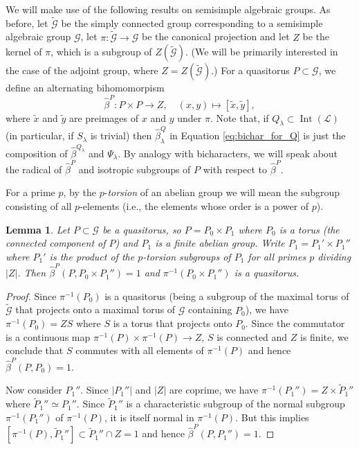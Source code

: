 \documentclass[a4paper,reqno]{amsart}
\newtheorem{lemma}[theorem]{Lemma}
\theoremstyle{definition}
\numberwithin{theorem}{section}
\numberwithin{equation}{section}
\begin{document}
We will make use of the following results on semisimple algebraic groups. As before, let $\tilde{\mathcal{G}}$ be the simply connected group corresponding to a semisimple algebraic group ${\mathcal{G}}$, let $\pi\colon\tilde{\mathcal{G}}\to{\mathcal{G}}$ be the canonical projection and let $Z$ be the kernel of $\pi$, which is a subgroup of $Z(\tilde{\mathcal{G}})$. (We will be primarily interested in the case of the adjoint group, where $Z=Z(\tilde{\mathcal{G}})$.) For a quasitorus $P\subset{\mathcal{G}}$, we define an alternating bihomomorpism
\begin{equation}\label{eq:def_beta_quasitorus}
\hat{\beta}^P\colon P\times P\to Z,\quad (x,y)\mapsto [\tilde{x},\tilde{y}],
\end{equation}
where $\tilde{x}$ and $\tilde{y}$ are preimages of $x$ and $y$ under $\pi$. Note that, if $Q_\lambda\subset\operatorname{\mathrm{Int}}({\mathcal{L}})$  (in particular, if $S_\lambda$ is trivial) then $\hat{\beta}_\lambda^Q$ in Equation \eqref{eq:bichar_for_Q} is just the composition of $\hat{\beta}^{Q_\lambda}$ and $\Psi_\lambda$. By analogy with bicharacters, we will speak about the radical of $\hat{\beta}^P$ and isotropic subgroups of $P$ with respect to $\hat{\beta}^P$.

For a prime $p$, by the $p$-{\em torsion} of an abelian group we will mean the subgroup consisting of all $p$-elements (i.e., the elements whose order is a power of $p$).

\begin{lemma}\label{lm:1}
Let $P\subset{\mathcal{G}}$ be a quasitorus, so $P=P_0\times P_1$ where $P_0$ is a torus (the connected component of $P$) and $P_1$ is a finite abelian group. Write $P_1=P_1'\times P_1''$ where $P_1'$ is the product of the $p$-torsion subgroups of $P_1$ for all primes $p$ dividing $|Z|$. Then $\hat{\beta}^P(P,P_0\times P_1'')=1$ and $\pi^{-1}(P_0\times P_1'')$ is a quasitorus.
\end{lemma}

\begin{proof}
Since $\pi^{-1}(P_0)$ is a quasitorus (being a subgroup of the maximal torus of $\tilde{\mathcal{G}}$ that projects onto a maximal torus of ${\mathcal{G}}$ containing $P_0$), we have $\pi^{-1}(P_0)=ZS$ where $S$ is a torus that projects onto $P_0$. Since the commutator is a continuous map $\pi^{-1}(P)\times\pi^{-1}(P)\to Z$, $S$ is connected and $Z$ is finite, we conclude that $S$ commutes with all elements of $\pi^{-1}(P)$ and hence $\hat{\beta}^P(P,P_0)=1$. 

Now consider $P_1''$. Since $|P_1''|$ and $|Z|$ are coprime, we have $\pi^{-1}(P_1'')=Z\times\tilde{P}_1''$ where $\tilde{P}_1''\simeq P_1''$. Since $\tilde{P}_1''$ is a characteristic subgroup of the normal subgroup $\pi^{-1}(P_1'')$ of $\pi^{-1}(P)$, it is itself normal in $\pi^{-1}(P)$. But this implies $[\pi^{-1}(P),\tilde{P}_1'']\subset\tilde{P}_1''\cap Z=1$ and hence $\hat{\beta}^P(P,P_1'')=1$.
\end{proof}
\end{document}
